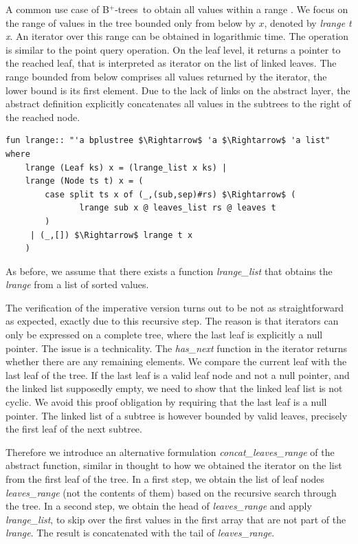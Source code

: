 \documentclass[a4paper,UKenglish,cleveref, cref, thm-restate]{lipics-v2021}
\newcommand{\btrees}{B$^+$-trees}
\begin{document}
A common use case of \btrees\ 
to obtain all values within a range \cite{DBLP:journals/ftdb/Graefe11}.
We focus on the range of values in the tree bounded only from below by $x$,
denoted by \emph{lrange t x}.
An iterator over this range can be obtained in logarithmic time.
The operation is similar to the point query operation.
On the leaf level, it returns a pointer to the
reached leaf, that is interpreted as iterator on the list of linked leaves.
The range bounded from below comprises all values returned by the iterator,
the lower bound is its first element.
Due to the lack of links on the abstract layer,
the abstract definition explicitly concatenates all values in the subtrees 
to the right of the reached node.

\begin{lstlisting}[mathescape=true, language=Isabelle,label=lst:btree-lrange]
fun lrange:: "'a bplustree $\Rightarrow$ 'a $\Rightarrow$ 'a list" where
    lrange (Leaf ks) x = (lrange_list x ks) |
    lrange (Node ts t) x = (
        case split ts x of (_,(sub,sep)#rs) $\Rightarrow$ (
               lrange sub x @ leaves_list rs @ leaves t
        )
     | (_,[]) $\Rightarrow$ lrange t x
    )
\end{lstlisting}
  
As before, we assume that there exists a function \textit{lrange\_list} that
obtains the \emph{lrange} from a list of sorted values.

The verification of the imperative version turns out to be not as straightforward
as expected, exactly due to this recursive step.
The reason is that iterators can only be expressed on a complete tree,
where the last leaf is explicitly a null pointer.
The issue is a technicality. The \textit{has\_next} function
in the iterator returns whether there are any remaining elements.
We compare the current leaf with the last leaf of the tree.
If the last leaf is a valid leaf node and not a null pointer, and
the linked list supposedly empty, we need to show
that the linked leaf list is not cyclic.
We avoid this proof obligation by requiring that the last leaf is a null pointer.
The linked list of a subtree is however bounded by valid leaves,
precisely the first leaf of the next subtree.

Therefore we introduce an alternative formulation \emph{concat\_leaves\_range} of the
abstract function, similar in thought to how we obtained the iterator
on the list from the first leaf of the tree.
In a first step, we obtain the list of leaf nodes \emph{leaves\_range} (not the contents of them)
based on the recursive search through the tree.
In a second step, we obtain the head of \emph{leaves\_range} and apply \emph{lrange\_list},
to skip over the first values in the first array that are not part of the \emph{lrange}.
The result is concatenated with the tail of \emph{leaves\_range}.
\end{document}
